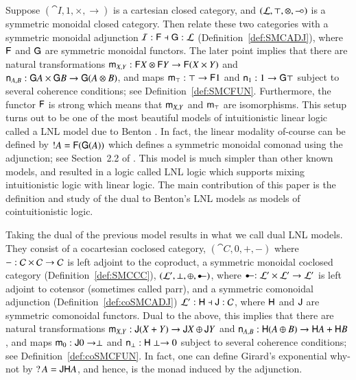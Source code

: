 Suppose $(\cat{I}, 1, \times, \to)$ is a cartesian closed category,
and $(\mathcal{L}, \top, \otimes, \mathrel{-\!\circ})$ is a symmetric monoidal closed
category.  Then relate these two categories with a symmetric monoidal
adjunction $\mathcal{I} : \mathsf{F} \dashv \mathsf{G} : \mathcal{L}$
(Definition~\ref{def:SMCADJ}), where $\mathsf{F}$ and $\mathsf{G}$ are
symmetric monoidal functors.  The later point implies that there are
natural transformations $\mathsf{m}_{X,Y} : \mathsf{F}X \otimes \mathsf{F}Y \rightarrow
\mathsf{F}(X \times Y)$ and $\mathsf{n}_{A,B} : \mathsf{G}A \times \mathsf{G}B \rightarrow
\mathsf{G}(A \otimes B)$, and maps $\mathsf{m}_{\top} : \top \rightarrow \mathsf{F}1$ and
$\mathsf{n}_{1} : 1 \rightarrow \mathsf{G}\top$ subject to several coherence conditions;
see Definition~\ref{def:SMCFUN}.  Furthermore, the functor $\mathsf{F}$
is strong which means that $\mathsf{m}_{X,Y}$ and $\mathsf{m}_{\top}$ are isomorphisms.
This setup turns out to be one of the most beautiful models of
intuitionistic linear logic called a LNL model due to Benton
\cite{Benton:1994}.  In fact, the linear modality of-course can be
defined by $!A = \mathsf{F}(\mathsf{G}(A))$ which defines a symmetric
monoidal comonad using the adjunction; see Section~2.2 of
\cite{Benton:1994}.  This model is much simpler than other known
models, and resulted in a logic called LNL logic which supports mixing
intuitionistic logic with linear logic.  The main contribution of this
paper is the definition and study of the dual to Benton's LNL models
as models of cointuitionistic logic.

Taking the dual of the previous model results in what we call dual LNL
models. They consist of a cocartesian coclosed category, $(\cat{C}, 0,
+, -)$ where $- : \mathcal{C} \times \mathcal{C} \rightarrow \mathcal{C}$ is left adjoint
to the coproduct, a symmetric monoidal coclosed category
(Definition~\ref{def:SMCCC}), $(\cat{L}', \perp, \oplus, \colimp)$,
where $\colimp : \cat{L}' \times \cat{L}' \mto \cat{L}'$ is left
adjoint to cotensor (sometimes called parr), and a symmetric
comonoidal adjunction (Definition~\ref{def:coSMCADJ}) $\mathcal{L'} :
\mathsf{H} \dashv \mathsf{J} : \mathcal{C}$, where $\mathsf{H}$ and $\mathsf{J}$
are symmetric comonoidal functors. Dual to the above, this implies
that there are natural transformations $\mathsf{m}_{X,Y} : \mathsf{J}(X + Y) \rightarrow
\mathsf{J}X \oplus \mathsf{J}Y$ and $\mathsf{n}_{A,B} : \mathsf{H}(A \oplus B) \rightarrow
\mathsf{H}A + \mathsf{H}B$, and maps $\mathsf{m}_{0} : \mathsf{J}0 \rightarrow \perp$ and
$\mathsf{n}_{\perp} : \mathsf{H}\perp \rightarrow 0$ subject to several coherence conditions;
see Definition~\ref{def:coSMCFUN}.  In fact, one can define Girard's
exponential why-not by $\mathop{?} A = \mathsf{JH}A$, and hence, is the monad
induced by the adjunction.

